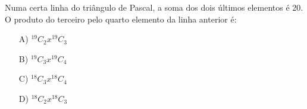 Numa certa linha do triângulo de Pascal, a soma dos dois últimos elementos é 20.
O produto do terceiro pelo quarto elemento da linha anterior é:

\begin{enumerate}
\item [A)] $^19C_2x^19C_3$
\item [B)] $^19C_3x^19C_4$
\item [C)] $^18C_3x^18C_4$
\item [D)] $^18C_2x^18C_3$
\end{enumerate}